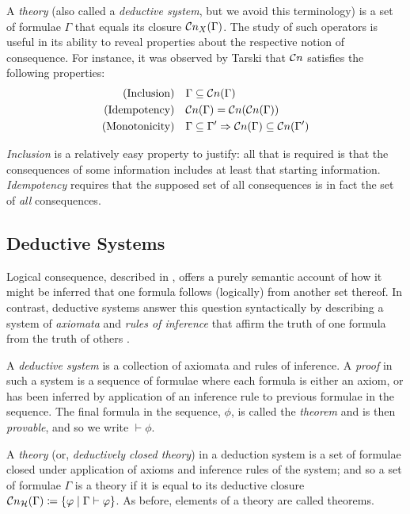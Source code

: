 A \textit{theory} (also called a \textit{deductive system}, but we avoid this terminology) is a set of formulae $\Gamma$ that equals its closure $\mathcal{C}n_X (\Gamma)$. The study of such operators is useful in its ability to reveal properties about the respective notion of consequence. For instance, it was observed by Tarski \cite[p. 84]{tarski1936operator} that $\mathcal{C}n$ satisfies the following properties:
%
\begin{align}
     \text{(Inclusion)} & \quad \Gamma \subseteq \mathcal{C}n (\Gamma) \\
     \text{(Idempotency)} & \quad  \mathcal{C}n (\Gamma) = \mathcal{C}n (\mathcal{C}n (\Gamma)) \\
     \text{(Monotonicity)} & \quad \Gamma \subseteq \Gamma' \Rightarrow \mathcal{C}n (\Gamma) \subseteq \mathcal{C}n (\Gamma')
\end{align}

\textit{Inclusion} is a relatively easy property to justify: all that is required is that the consequences of some information includes at least that starting information. \textit{Idempotency} requires that the supposed set of all consequences is in fact the set of \textit{all} consequences.

\subsection{Deductive Systems}
\label{subsection:deduction-systems}
  
Logical consequence, described in , offers a purely semantic account of how it might be inferred that one formula follows (logically) from another set thereof. In contrast, deductive systems answer this question syntactically by describing a system of \textit{axiomata} and \textit{rules of inference} that affirm the truth of one formula from the truth of others \cite[p. 49]{Ben1993Mathematical}.

\begin{definition}
\label{definition:deductive-system}
A \textit{deductive system} is a collection of axiomata and rules of inference. A \textit{proof} in such a system is a sequence of formulae where each formula is either an axiom, or has been inferred by application of an inference rule to previous formulae in the sequence. The final formula in the sequence, $\phi$, is called the \textit{theorem} and is then \textit{provable}, and so we write $\vdash \phi$.

A \textit{theory} (or, \textit{deductively closed theory}) in a deduction system is a set of formulae closed under application of axioms and inference rules of the system; and so a set of formulae $\Gamma$ is a theory if it is equal to its deductive closure $\mathcal{C}n_\mathcal{H} (\Gamma) \coloneqq \{\varphi \mid \Gamma \vdash \varphi \}$. As before, elements of a theory are called theorems.
\end{definition}

